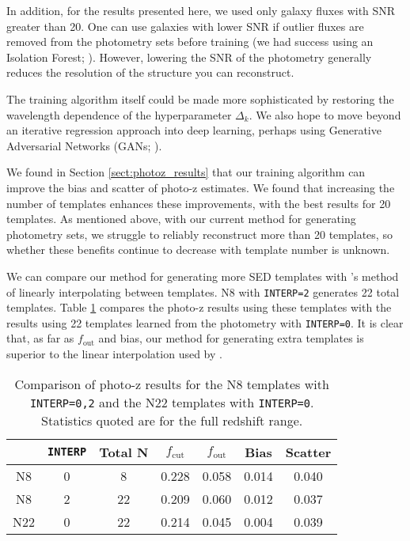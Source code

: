 In addition, for the results presented here, we used only galaxy fluxes with SNR greater than 20.
One can use galaxies with lower SNR if outlier fluxes are removed from the photometry sets before training (we had success using an Isolation Forest; \citealt{Ting2008,Liu2012}).
However, lowering the SNR of the photometry generally reduces the resolution of the structure you can reconstruct.

The training algorithm itself could be made more sophisticated by restoring the wavelength dependence of the hyperparameter $\Delta_k$.
We also hope to move beyond an iterative regression approach into deep learning, perhaps using Generative Adversarial Networks (GANs; \citealt{Goodfellow2014}).

We found in Section \ref{sect:photoz_results} that our training algorithm can improve the bias and scatter of photo-z estimates.
We found that increasing the number of templates enhances these improvements, with the best results for 20 templates.
As mentioned above, with our current method for generating photometry sets, we struggle to reliably reconstruct more than 20 templates, so whether these benefits continue to decrease with template number is unknown.

We can compare our method for generating more SED templates with \bpz's method of linearly interpolating between templates.
N8 with \texttt{INTERP=2} generates 22 total templates.
Table \ref{tab:interp_comparison} compares the photo-z results using these templates with the results using 22 templates learned from the photometry with \texttt{INTERP=0}.
It is clear that, as far as $f_\text{out}$ and bias, our method for generating extra templates is superior to the linear interpolation used by \bpz. 

\begin{table}
    \caption{Comparison of photo-z results for the N8 templates with \texttt{INTERP=0,2} and the N22 templates with \texttt{INTERP=0}. Statistics quoted are for the full redshift range.}
    \label{tab:interp_comparison}
    \centering
    \begin{tabular}{c c c c c c c}
        \hline \hline
        & \texttt{INTERP} & Total N & $f_\text{cut}$ & $f_\text{out}$ & Bias & Scatter \\
        \hline

        N8  & 0 &  8 & 0.228 & 0.058 & 0.014 & 0.040 \\
        N8  & 2 & 22 & 0.209 & 0.060 & 0.012 & 0.037 \\
        N22 & 0 & 22 & 0.214 & 0.045 & 0.004 & 0.039 \\

        \hline
    \end{tabular}
\end{table}

